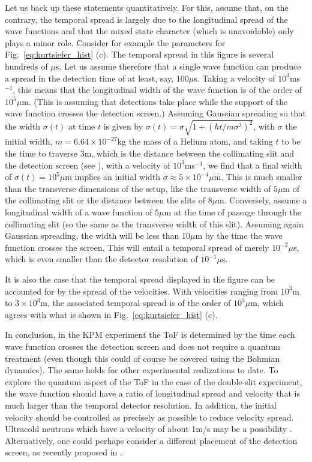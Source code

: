 \documentclass[11pt,a4paper]{article}
\begin{document}
Let us back up these statements quantitatively. For this, assume that, on the contrary, the temporal spread is largely due to the longitudinal spread of the wave functions and that the mixed state character (which is unavoidable) only plays a minor role. Consider for example the parameters for Fig.\ \ref{eq:kurtsiefer_hist} (c). The temporal spread in this figure is several hundreds of ${\mu}$s. Let us assume therefore that a single wave function can produce a spread in the detection time of at least, say, 100${\mu}$s. Taking a velocity of $10^3$ms$^{-1}$, this means that the longitudinal width of the wave function is of the order of $10^5{\mu}$m. (This is assuming that detections take place while the support of the wave function crosses the detection screen.) 
Assuming Gaussian spreading so that the width $\sigma(t)$ at time $t$ is given by $\sigma(t) =\sigma \sqrt{1+(\hbar t/ m \sigma^2)^2}$, with $\sigma$ the initial width, $m=6.64 \times 10^{-27}$kg the mass of a Helium atom, and taking $t$ to be the time to traverse 3m, which is the distance between the collimating slit and the detection screen (see \cite[Fig.\ 2]{Pfau}), with a velocity of $10^3$ms$^{-1}$, we find that a final width of $\sigma(t)=10^5{\mu}$m implies an initial width $\sigma \approx 5\times 10^{-4}{\mu}$m. This is much smaller than the transverse dimensions of the setup, like the transverse width of $5\mu$m of the collimating slit or the distance between the slits of $8\mu$m. Conversely, assume a longitudinal width of a wave function of $5\mu$m at the time of passage through the collimating slit (so the same as the transverse width of this slit). Assuming again Gaussian spreading, the width will be less than $10\mu$m by the time the wave function crosses the screen. This will entail a temporal spread of merely $10^{-2}\mu$s, which is even smaller than the detector resolution of $10^{-1}\mu$s. 

It is also the case that the temporal spread displayed in the figure can be accounted for by the spread of the velocities. With velocities ranging from $10^3$m to $3\times10^3$m, the associated temporal spread is of the order of $10^3\mu$m, which agrees with what is shown in Fig.\ \ref{eq:kurtsiefer_hist} (c). 

In conclusion, in the KPM experiment the ToF is determined by the time each wave function crosses the detection screen and does not require a quantum treatment (even though this could of course be covered using the Bohmian dynamics). The same holds for other experimental realizations to date. To explore the quantum aspect of the ToF in the case of the double-slit experiment, the wave function should have a ratio of longitudinal spread and velocity that is much larger than the temporal detector resolution. In addition, the initial velocity should be controlled as precisely as possible to reduce velocity spread. Ultracold neutrons which have a velocity of about 1m/s may be a possibility \cite{viale}. Alternatively, one could perhaps consider a different placement of the detection screen, as recently proposed in \cite{Ayatollah}.
\end{document}
